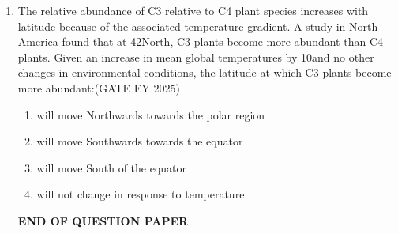 \begin{enumerate}[leftmargin=*,label=\textbf{Q.\arabic*},resume]
\item The relative abundance of C3 relative to C4 plant species increases with latitude because of the associated temperature gradient. A study in North America found that at 42\degree North, C3 plants become more abundant than C4 plants. Given an increase in mean global temperatures by 10\degree and no other changes in environmental conditions, the latitude at which C3 plants become more abundant:\hfill {(GATE EY 2025)}
\begin{enumerate}
\item will move Northwards towards the polar region
\item will move Southwards towards the equator
\item will move South of the equator
\item will not change in response to temperature
\end{enumerate}
\begin{center}
  \textbf{END OF QUESTION PAPER}  
\end{center}
\end{enumerate}



